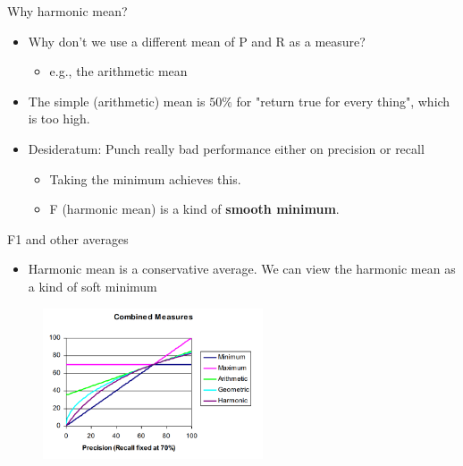 \documentclass[serif, aspectratio=169]{beamer}
\begin{document}
\begin{frame}{Why harmonic mean?}
    \begin{itemize}
        \item Why don't we use a different mean of P and R as a measure?
        \begin{itemize}
            \item e.g., the arithmetic mean
        \end{itemize}
        \item The simple (arithmetic) mean is $50\%$ for "return true for every thing", which is too high.
        \item Desideratum: Punch really bad performance either on precision or recall
        \begin{itemize}
            \item Taking the minimum achieves this.
            \item F (harmonic mean) is a kind of \textbf{smooth minimum}.
        \end{itemize}
    \end{itemize}
\end{frame}
\begin{frame}{F1 and other averages}
    \begin{itemize}
        \item Harmonic mean is a conservative average. We can view the harmonic mean as a kind of soft minimum
    \end{itemize}
    
    \begin{figure}[h]
            \centering
            
            \includegraphics[width=0.58\textwidth]{pic/F1andOthers.png}
            \end{figure}
\end{frame}
            
\end{document}
